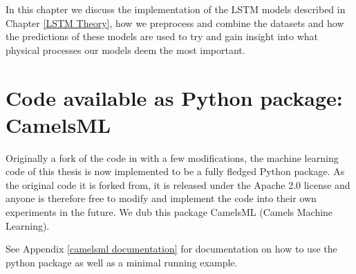 In this chapter we discuss the implementation of the LSTM models described in Chapter 
\ref{LSTM Theory}, how we preprocess and combine the datasets 
and how the predictions of these models are used to try and gain 
insight into what physical processes our models deem the most important.
\section{Code available as Python package: CamelsML}
Originally a fork of the code in \citet{lstm_second_paper} with a few modifications, 
the machine learning code of this thesis is now implemented to be a fully fledged 
Python package. As the original code it is forked from, it is released under the 
Apache 2.0 license and anyone is therefore free to modify and implement the code 
into their own experiments in the future.
We dub this package CamelsML (Camels Machine Learning).


See Appendix \ref{camelsml documentation} for documentation on how to use the python 
package as well as a minimal running example.

